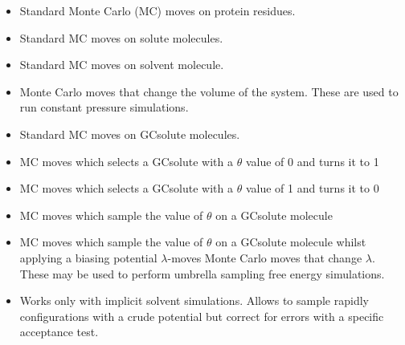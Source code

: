 \documentclass[letterpaper,10pt,english]{sphinxmanual}
\begin{document}
\begin{itemize}
\item {} 
 Standard Monte Carlo (MC) moves on protein residues.

\item {} 
 Standard MC moves on solute molecules.

\item {} 
 Standard MC moves on solvent molecule.

\item {} 
 Monte Carlo moves that change the volume of the system. These are used to run constant pressure simulations.

\item {} 
 Standard MC moves on GCsolute molecules.

\item {} 
 MC moves which selects a GCsolute with a \(\theta\) value of 0 and turns it to 1

\item {} 
 MC moves which selects a GCsolute with a \(\theta\) value of 1 and turns it to 0

\item {} 
 MC moves which sample the value of \(\theta\) on a GCsolute molecule

\item {} 
 MC moves which sample the value of \(\theta\) on a GCsolute molecule whilst applying a biasing potential \(\lambda\)-moves Monte Carlo moves that change \(\lambda\). These may be used to perform umbrella sampling free energy simulations.

\item {} 
 Works only with implicit solvent simulations. Allows to sample rapidly configurations with a crude potential but correct for errors with a specific acceptance test.

\end{itemize}
\end{document}
